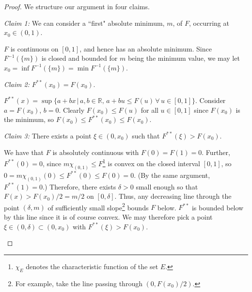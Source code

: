 \documentclass[11pt]{article}
\numberwithin{equation}{section}
\begin{document}
\begin{proof}
    We structure our argument in four claims.  
    
    \textit{Claim 1:} We can consider a ``first" absolute minimum, $m$, of $F$, occurring at $x_0\in(0,1)$. 
    
    $F$ is continuous on $[0,1]$, and hence has an absolute minimum. Since $F^{-1}(\{m\})$ is closed and bounded for $m$ being the minimum value, we may let $x_0=\inf F^{-1}(\{m\})=\min F^{-1}(\{m\})$. 

    \textit{Claim 2:} $F^{**}(x_0)=F(x_0)$.

    $F^{**}(x)=\sup\{a+bx \, | \, a,b\in\mathbb{R}\text{, } a+bu\leq F(u) \, \forall \, u\in[0,1]\}$. Consider $a=F(x_0)$, $b=0$. Clearly $F(x_0)\leq F(u)$ for all $u\in[0,1]$ since $F(x_0)$ is the minimum, so $F(x_0)\leq F^{**}(x_0)\leq F(x_0)$.

    \textit{Claim 3:} There exists a point $\xi\in(0,x_0)$ such that $F^{**}(\xi)>F(x_0)$.

    We have that $F$ is absolutely continuous with $F(0)=F(1)=0$. Further, $F^{**}(0)=0$, since 
    $m\chi_{(0,1)}\leq F$\footnote{$\chi_E$ denotes the characteristic function of the set $E$.} is convex on the closed interval $[0,1]$, so
    $0=m\chi_{(0,1)}(0)\leq F^{**}(0)\leq F(0)=0$. (By the same argument, $F^{**}(1)=0$.) Therefore, there exists $\delta>0$ small enough so that $F(x)>F(x_0)/2=m/2$ on $[0,\delta]$. Thus, any decreasing line through the point $(\delta,m)$ of sufficiently small slope\footnote{For example, take the line passing through $(0,F(x_0)/2)$.} bounds $F$ below. $F^{**}$ is bounded below by this line since it is of course convex. We may therefore pick a point $\xi\in(0,\delta)\subset(0,x_0)$ with $F^{**}(\xi)>F(x_0)$. 

    \begin{figure}
    \centering
\end{figure}
\end{proof}
\end{document}

